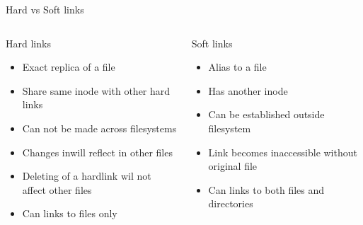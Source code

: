 \documentclass[usenames,dvipsnames,10pt,aspectratio=169]{beamer}
\begin{document}
\begin{frame}{Hard vs Soft links}
    \begin{columns}[t, totalwidth=\textwidth]
        \begin{column}{0.47\linewidth}
            {\huge Hard links}
            \begin{itemize}
                \item Exact replica of a file
                \item Share same inode with other hard links
                \item Can not be made across filesystems
                \item Changes inwill reflect in other files
                \item Deleting of a hardlink wil not affect other files
                \item Can links to files only
            \end{itemize}
        \end{column}

        \begin{column}{0.47\linewidth}
            {\huge Soft links}
                \begin{itemize}
                    \item Alias to a file
                    \item Has another inode 
                    \item Can be established outside filesystem
                    \item Link becomes inaccessible without original file
                    \item Can links to both files and directories
                \end{itemize}
        \end{column}
    \end{columns}
\end{frame}
\end{document}
